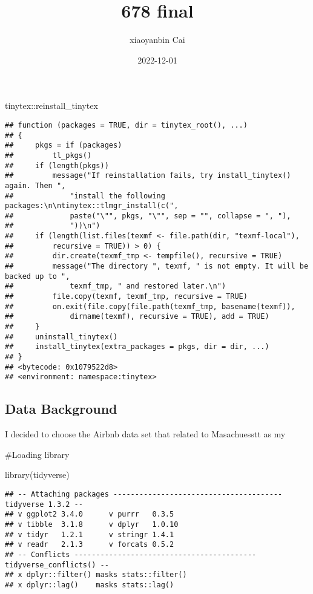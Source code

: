 \documentclass[
]{article}
\title{678 final}
\author{xiaoyanbin Cai}
\date{2022-12-01}
\newenvironment{Shaded}{\begin{snugshade}}{\end{snugshade}}
\newcommand{\FunctionTok}[1]{\textcolor[rgb]{0.00,0.00,0.00}{#1}}
\newcommand{\NormalTok}[1]{#1}
\newcommand{\SpecialCharTok}[1]{\textcolor[rgb]{0.00,0.00,0.00}{#1}}
\begin{document}
\maketitle

\begin{Shaded}
\begin{Highlighting}[]
\NormalTok{tinytex}\SpecialCharTok{::}\NormalTok{reinstall\_tinytex}
\end{Highlighting}
\end{Shaded}

\begin{verbatim}
## function (packages = TRUE, dir = tinytex_root(), ...) 
## {
##     pkgs = if (packages) 
##         tl_pkgs()
##     if (length(pkgs)) 
##         message("If reinstallation fails, try install_tinytex() again. Then ", 
##             "install the following packages:\n\ntinytex::tlmgr_install(c(", 
##             paste("\"", pkgs, "\"", sep = "", collapse = ", "), 
##             "))\n")
##     if (length(list.files(texmf <- file.path(dir, "texmf-local"), 
##         recursive = TRUE)) > 0) {
##         dir.create(texmf_tmp <- tempfile(), recursive = TRUE)
##         message("The directory ", texmf, " is not empty. It will be backed up to ", 
##             texmf_tmp, " and restored later.\n")
##         file.copy(texmf, texmf_tmp, recursive = TRUE)
##         on.exit(file.copy(file.path(texmf_tmp, basename(texmf)), 
##             dirname(texmf), recursive = TRUE), add = TRUE)
##     }
##     uninstall_tinytex()
##     install_tinytex(extra_packages = pkgs, dir = dir, ...)
## }
## <bytecode: 0x1079522d8>
## <environment: namespace:tinytex>
\end{verbatim}

\hypertarget{data-background}{%
\subsection{Data Background}\label{data-background}}

I decided to choose the Airbnb data set that related to Masachuesstt as
my

\#Loading library

\begin{Shaded}
\begin{Highlighting}[]
\FunctionTok{library}\NormalTok{(tidyverse)}
\end{Highlighting}
\end{Shaded}

\begin{verbatim}
## -- Attaching packages --------------------------------------- tidyverse 1.3.2 --
## v ggplot2 3.4.0      v purrr   0.3.5 
## v tibble  3.1.8      v dplyr   1.0.10
## v tidyr   1.2.1      v stringr 1.4.1 
## v readr   2.1.3      v forcats 0.5.2 
## -- Conflicts ------------------------------------------ tidyverse_conflicts() --
## x dplyr::filter() masks stats::filter()
## x dplyr::lag()    masks stats::lag()
\end{verbatim}
\end{document}

